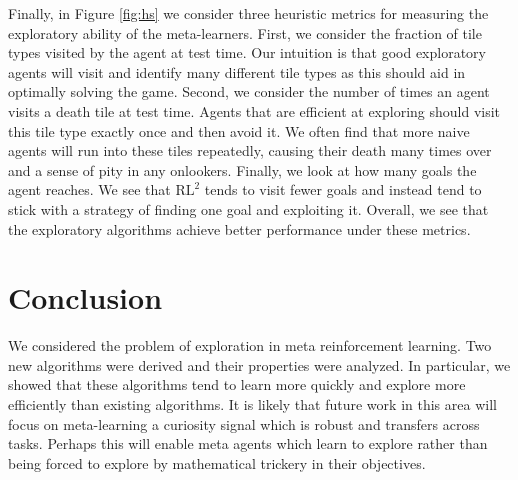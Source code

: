 \documentclass{article} %
\begin{document}
Finally, in Figure \ref{fig:hs} we consider three heuristic metrics for measuring the exploratory ability of the meta-learners. First, we consider the fraction of tile types visited by the agent at test time. Our intuition is that good exploratory agents will visit and identify many different tile types as this should aid in optimally solving the game. Second, we consider the number of times an agent visits a death tile at test time. Agents that are efficient at exploring should visit this tile type exactly once and then avoid it. We often find that more naive agents will run into these tiles repeatedly, causing their death many times over and a sense of pity in any onlookers. Finally, we look at how many goals the agent reaches. We see that $\text{RL}^2$ tends to visit fewer goals and instead tend to stick with a strategy of finding one goal and exploiting it. Overall, we see that the exploratory algorithms achieve better performance under these metrics. 

\section{Conclusion} 
We considered the problem of exploration in meta reinforcement learning. Two new algorithms were derived and their properties were analyzed. In particular, we showed that these algorithms tend to learn more quickly and explore more efficiently than existing algorithms. It is likely that future work in this area will focus on meta-learning a curiosity signal which is robust and transfers across tasks. Perhaps this will enable meta agents which learn to explore rather than being forced to explore by mathematical trickery in their objectives. 
\end{document}
